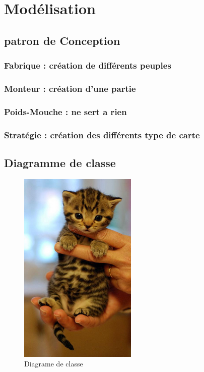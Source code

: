 \section{Modélisation}
	\subsection{patron de Conception}
		\subsubsection{Fabrique : création de différents peuples}
		
		\subsubsection{Monteur : création d'une partie}
		\subsubsection{Poids-Mouche : ne sert a rien}
		\subsubsection{Stratégie : création des différents type de carte}

	\subsection{Diagramme de classe}


	\begin{figure}
		\begin{center}
			\includegraphics[width=0.5\textwidth]{figure/diagramme_de_classe.png}
		\end{center}
		\caption{Diagrame de classe}
		\label{fig:planif}
	\end{figure}




